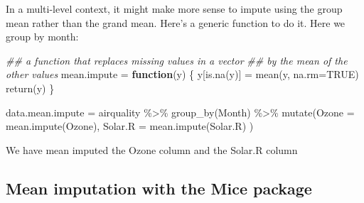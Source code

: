 \documentclass[
  letterpaper,
  DIV=11,
  numbers=noendperiod]{scrreprt}
\newenvironment{Shaded}{}{}
\newcommand{\AttributeTok}[1]{\textcolor[rgb]{0.49,0.56,0.16}{#1}}
\newcommand{\ConstantTok}[1]{\textcolor[rgb]{0.53,0.00,0.00}{#1}}
\newcommand{\ControlFlowTok}[1]{\textcolor[rgb]{0.00,0.44,0.13}{\textbf{#1}}}
\newcommand{\DocumentationTok}[1]{\textcolor[rgb]{0.73,0.13,0.13}{\textit{#1}}}
\newcommand{\FunctionTok}[1]{\textcolor[rgb]{0.02,0.16,0.49}{#1}}
\newcommand{\NormalTok}[1]{#1}
\newcommand{\OtherTok}[1]{\textcolor[rgb]{0.00,0.44,0.13}{#1}}
\newcommand{\SpecialCharTok}[1]{\textcolor[rgb]{0.25,0.44,0.63}{#1}}
\newcommand{\StringTok}[1]{\textcolor[rgb]{0.25,0.44,0.63}{#1}}
\begin{document}
\begin{Shaded}
\end{Shaded}

In a multi-level context, it might make more sense to impute using the
group mean rather than the grand mean. Here's a generic function to do
it. Here we group by month:

\begin{Shaded}
\begin{Highlighting}[]
\DocumentationTok{\#\# a function that replaces missing values in a vector }
\DocumentationTok{\#\# by the mean of the other values}
\NormalTok{  mean.impute }\OtherTok{=} \ControlFlowTok{function}\NormalTok{(y) \{ }
\NormalTok{      y[}\FunctionTok{is.na}\NormalTok{(y)] }\OtherTok{=} \FunctionTok{mean}\NormalTok{(y, }\AttributeTok{na.rm=}\ConstantTok{TRUE}\NormalTok{)}
      \FunctionTok{return}\NormalTok{(y)}
\NormalTok{  \}}

\NormalTok{  data.mean.impute }\OtherTok{=}\NormalTok{ airquality }\SpecialCharTok{\%\textgreater{}\%} \FunctionTok{group\_by}\NormalTok{(Month) }\SpecialCharTok{\%\textgreater{}\%}
    \FunctionTok{mutate}\NormalTok{(}\AttributeTok{Ozone =} \FunctionTok{mean.impute}\NormalTok{(Ozone),}
           \AttributeTok{Solar.R =} \FunctionTok{mean.impute}\NormalTok{(Solar.R) ) }
\end{Highlighting}
\end{Shaded}

We have mean imputed the Ozone column and the Solar.R column

\subsection{Mean imputation with the Mice
package}\label{mean-imputation-with-the-mice-package}
\end{document}
